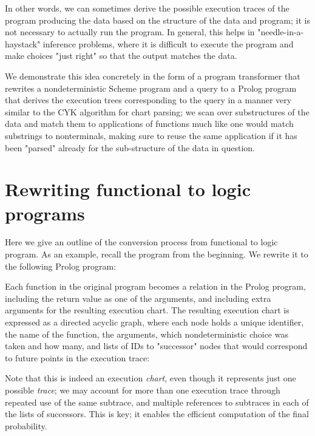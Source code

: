 \documentclass{acmsiggraph}
\begin{document}
In other words, we can sometimes derive the possible execution traces of the
program producing the data based on the structure of the data and program; it
is not necessary to actually run the program. In general, this helps in
"needle-in-a-haystack" inference problems, where it is difficult to execute the
program and make choices "just right" so that the output matches the data.

We demonstrate this idea concretely in the form of a program transformer that
rewrites a nondeterministic Scheme program and a query to a Prolog program that
derives the execution trees corresponding to the query in a manner very similar
to the CYK algorithm for chart parsing; we scan over substructures of the data
and match them to applications of functions much like one would match
substrings to nonterminals, making sure to reuse the same application if it has
been "parsed" already for the sub-structure of the data in question.

\section{Rewriting functional to logic programs}

Here we give an outline of the conversion process from functional to logic program.
As an example, recall the program from the beginning. We rewrite it to the following Prolog program:

\lstset{language=Prolog}


Each function in the original program becomes a relation in the Prolog program,
including the return value as one of the arguments, and including extra
arguments for the resulting execution chart. The resulting execution chart is
expressed as a directed acyclic graph, where each node holds a unique
identifier, the name of the function, the arguments, which nondeterministic
choice was taken and how many, and lists of IDs to "successor" nodes that would
correspond to future points in the execution trace:



Note that this is indeed an execution \textit{chart}, even though it represents
just one possible \textit{trace}; we may account for more than one execution
trace through repeated use of the same subtrace, and multiple references to
subtraces in each of the lists of successors. This is key; it enables the
efficient computation of the final probability.
\end{document}
